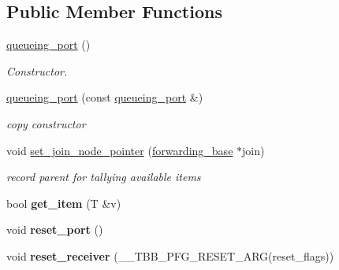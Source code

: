 \subsection*{Public Member Functions}
\begin{DoxyCompactItemize}
\item 
\hypertarget{classinternal_1_1queueing__port_a490b88d2d32e360f70e169711981feda}{}\hyperlink{classinternal_1_1queueing__port_a490b88d2d32e360f70e169711981feda}{queueing\+\_\+port} ()\label{classinternal_1_1queueing__port_a490b88d2d32e360f70e169711981feda}

\begin{DoxyCompactList}\small\item\em Constructor. \end{DoxyCompactList}\item 
\hypertarget{classinternal_1_1queueing__port_ae3ce8c06643164298edb702141830eeb}{}\hyperlink{classinternal_1_1queueing__port_ae3ce8c06643164298edb702141830eeb}{queueing\+\_\+port} (const \hyperlink{classinternal_1_1queueing__port}{queueing\+\_\+port} \&)\label{classinternal_1_1queueing__port_ae3ce8c06643164298edb702141830eeb}

\begin{DoxyCompactList}\small\item\em copy constructor \end{DoxyCompactList}\item 
\hypertarget{classinternal_1_1queueing__port_ae3860f28fbd47c47301bb93cc34f962b}{}void \hyperlink{classinternal_1_1queueing__port_ae3860f28fbd47c47301bb93cc34f962b}{set\+\_\+join\+\_\+node\+\_\+pointer} (\hyperlink{structinternal_1_1forwarding__base}{forwarding\+\_\+base} $\ast$join)\label{classinternal_1_1queueing__port_ae3860f28fbd47c47301bb93cc34f962b}

\begin{DoxyCompactList}\small\item\em record parent for tallying available items \end{DoxyCompactList}\item 
\hypertarget{classinternal_1_1queueing__port_aab8489d12db2fd9c3ba4ddf5079ee724}{}bool {\bfseries get\+\_\+item} (T \&v)\label{classinternal_1_1queueing__port_aab8489d12db2fd9c3ba4ddf5079ee724}

\item 
\hypertarget{classinternal_1_1queueing__port_a822c5d68413b5952a4dd24d22714c9e5}{}void {\bfseries reset\+\_\+port} ()\label{classinternal_1_1queueing__port_a822c5d68413b5952a4dd24d22714c9e5}

\item 
\hypertarget{classinternal_1_1queueing__port_a32a30c4b51bce92705aed61878735239}{}void {\bfseries reset\+\_\+receiver} (\+\_\+\+\_\+\+T\+B\+B\+\_\+\+P\+F\+G\+\_\+\+R\+E\+S\+E\+T\+\_\+\+A\+R\+G(reset\+\_\+flags))\label{classinternal_1_1queueing__port_a32a30c4b51bce92705aed61878735239}

\end{DoxyCompactItemize}

